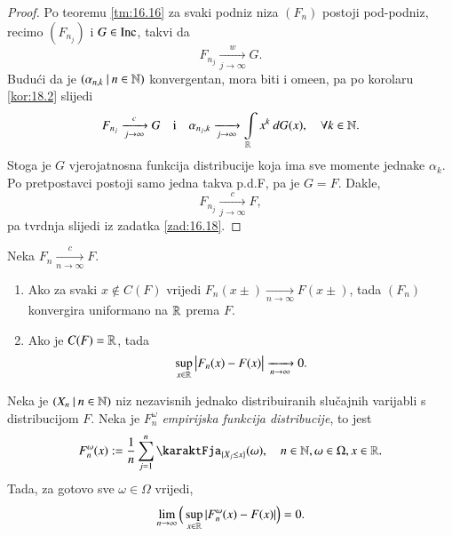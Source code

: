 \begin{proof}
    Po teoremu \ref{tm:16.16} za svaki podniz niza $(F_n)$ postoji pod-podniz, recimo $(F_{n_j})$ i $G \in \mathrm{Inc}$, takvi da
    \begin{equation*}
        F_{n_j} \xrightarrow[j \to \infty]{w} G.
    \end{equation*}
    Budu\' ci da je $({\alpha_{n, k}} \: | \: {n \in \mathbb{N}})$ konvergentan, mora biti i ome\dj en, pa po korolaru \ref{kor:18.2} slijedi
    \begin{equation*}
        F_{n_j} \xrightarrow[j \to \infty]{c} G \quad \textnormal{i} \quad \alpha_{n_j, k} \xrightarrow[j \to \infty]{} \int\limits_{\mathbb{R}} x^k \: d G (x), \quad \forall k \in \mathbb{N}.
    \end{equation*}
    Stoga je $G$ vjerojatnosna funkcija distribucije koja ima sve momente jednake $\alpha_k$.
    Po pretpostavci postoji samo jedna takva p.d.F, pa je $G = F$.
    Dakle,
    \begin{equation*}
        F_{n_j} \xrightarrow[j \to \infty]{c} F,
    \end{equation*}
    pa tvrdnja slijedi iz zadatka \ref{zad:16.18}.
\end{proof}

\begin{zad}  \label{zad:18.4}
    Neka $F_n \xrightarrow[n \to \infty]{c} F$.
    \begin{enumerate}[label=(\roman*)]
        \item   \label{zad:18.4.1}
        Ako za svaki $x \notin C(F)$ vrijedi $F_n (x \pm) \xrightarrow[n \to \infty]{} F (x \pm)$, tada $(F_n)$ konvergira uniformano na $\mathbb{R}$ prema $F$.
        \item   \label{zad:18.4.2}
        Ako je $C(F) = \mathbb{R}$, tada
        \begin{equation*}
            \sup\limits_{x \in \mathbb{R}} \big| F_n (x) - F(x) \big| \xrightarrow[n \to \infty]{} 0.
        \end{equation*}
    \end{enumerate}
\end{zad}

\begin{tm}   \label{tm:18.5}
    Neka je $({X_n} \: | \: {n \in \mathbb{N}})$ niz nezavisnih jednako distribuiranih slu\v cajnih varijabli s distribucijom $F$.
    Neka je $F^\omega_n$ \emph{empirijska funkcija distribucije}, to jest
    \begin{equation*}
        F^\omega_n (x) := \frac{1}{n} \suma{j = 1}{n} \karaktFja_{\{ X_j \leq x \}}(\omega), \quad n \in \nat, \omega \in \Omega, x \in \real.
    \end{equation*}
    Tada, za gotovo sve $\omega \in \Omega$ vrijedi,
    \begin{equation*}
        \lim\limits_{n \to \infty} \Big( \sup\limits_{x \in \mathbb{R}} | F^\omega_n(x) - F(x) | \Big) = 0.
    \end{equation*}
\end{tm}

